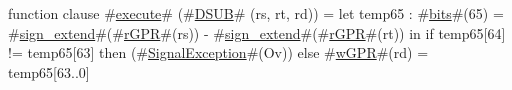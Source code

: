 function clause #\hyperref[zexecute]{execute}# (#\hyperref[zDSUB]{DSUB}# (rs, rt, rd)) =
  {
    let temp65 : #\hyperref[zbits]{bits}#(65) = #\hyperref[zsignzyextend]{sign\_extend}#(#\hyperref[zrGPR]{rGPR}#(rs)) - #\hyperref[zsignzyextend]{sign\_extend}#(#\hyperref[zrGPR]{rGPR}#(rt)) in
    {
      if temp65[64] != temp65[63] then
        (#\hyperref[zSignalException]{SignalException}#(Ov))
      else
        #\hyperref[zwGPR]{wGPR}#(rd) = temp65[63..0]
    }
  }
